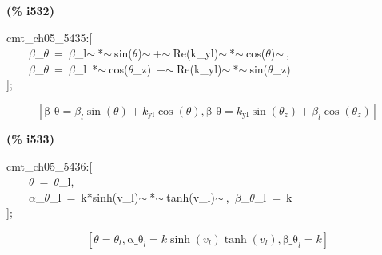 \documentclass[fleqn]{article}
\begin{document}
\noindent
\begin{minipage}[t]{4.000000em}\color{red}\bfseries
(\% i532)	
\end{minipage}
\begin{minipage}[t]{\textwidth}\color{blue}
cmt\_ch05\_5435:[\\
\ \ \ \ \ensuremath{\beta}\_\ensuremath{\theta}\ =\ \ensuremath{\beta}\_l\ensuremath{\sim\ }*\ensuremath{\sim\ }sin(\ensuremath{\theta})\ensuremath{\sim\ }+\ensuremath{\sim\ }Re(k\_yl)\ensuremath{\sim\ }*\ensuremath{\sim\ }cos(\ensuremath{\theta})\ensuremath{\sim\ },\\
\ \ \ \ \ensuremath{\beta}\_\ensuremath{\theta}\ =\ \ensuremath{\beta}\_l\ *\ensuremath{\sim\ }cos(\ensuremath{\theta}\_z)\ +\ensuremath{\sim\ }Re(k\_yl)\ensuremath{\sim\ }*\ensuremath{\sim\ }sin(\ensuremath{\theta}\_z)\\
];
\end{minipage}
\[\displaystyle \tag{\% o532} 
\left[ \ensuremath{\mathrm{\beta \_ \theta }}={{\beta }_l} \sin{\left( \theta \right) }+{k_{\ensuremath{\mathrm{yl}}}} \cos{\left( \theta \right) }\operatorname{,}\ensuremath{\mathrm{\beta \_ \theta }}={k_{\ensuremath{\mathrm{yl}}}} \sin{\left( {{\theta }_z}\right) }+{{\beta }_l} \cos{\left( {{\theta }_z}\right) }\right] \mbox{}
\]


\noindent
\begin{minipage}[t]{4.000000em}\color{red}\bfseries
(\% i533)	
\end{minipage}
\begin{minipage}[t]{\textwidth}\color{blue}
cmt\_ch05\_5436:[\\
\ \ \ \ \ensuremath{\theta}\ =\ \ensuremath{\theta}\_l,\\
\ \ \ \ \ensuremath{\alpha}\_\ensuremath{\theta}\_l\ =\ k*sinh(v\_l)\ensuremath{\sim\ }*\ensuremath{\sim\ }tanh(v\_l)\ensuremath{\sim\ },\ \ensuremath{\beta}\_\ensuremath{\theta}\_l\ =\ k\\
];
\end{minipage}
\[\displaystyle \tag{\% o533} 
\left[ \theta ={{\theta }_l}\operatorname{,}{{\ensuremath{\mathrm{\alpha \_ \theta }}}_l}=k \sinh{\left( {v_l}\right) } \operatorname{tanh}\left( {v_l}\right) \operatorname{,}{{\ensuremath{\mathrm{\beta \_ \theta }}}_l}=k\right] \mbox{}
\]
\end{document}
